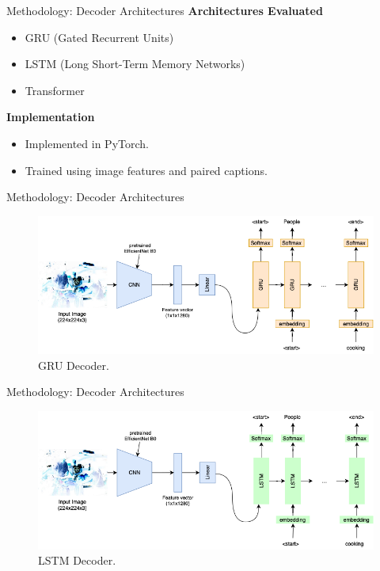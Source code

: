 \documentclass[10pt]{beamer}
\theoremstyle{remark}
\begin{document}
\begin{frame}{Methodology: Decoder Architectures}
	\textbf{Architectures Evaluated}
	\begin{itemize}
		\item GRU (Gated Recurrent Units)
		\item LSTM (Long Short-Term Memory Networks)
		\item Transformer
	\end{itemize}
	\textbf{Implementation}
	\begin{itemize}
		\item Implemented in PyTorch.
		\item Trained using image features and paired captions.
	\end{itemize}
\end{frame}

\begin{frame}{Methodology: Decoder Architectures}
	\begin{figure}[H]
		\includegraphics[width=.9\textwidth]{res/gru.png}
		\caption{GRU Decoder.}\label{fig:gru}
	\end{figure}
\end{frame}

\begin{frame}{Methodology: Decoder Architectures}
	\begin{figure}[H]
		\includegraphics[width=.9\textwidth]{res/lstm.png}
		\caption{LSTM Decoder.}\label{fig:lstm}
	\end{figure}
\end{frame}
\end{document}
